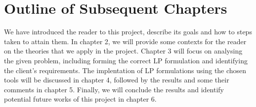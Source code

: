\section{Outline of Subsequent Chapters}
We have introduced the reader to this project, describe its goals and how to steps taken to attain them. In chapter 2,
we will provide some contexts for the reader on the theories that we apply in the project. Chapter 3 will focus on
analysing the given problem, including forming the correct LP formulation and identifying the client's requirements.
The implentation of LP formulations using the chosen tools will be discussed in chapter 4, followed by the results and
some their comments in chapter 5. Finally, we will conclude the results and identify potential future works
of this project in chapter 6.